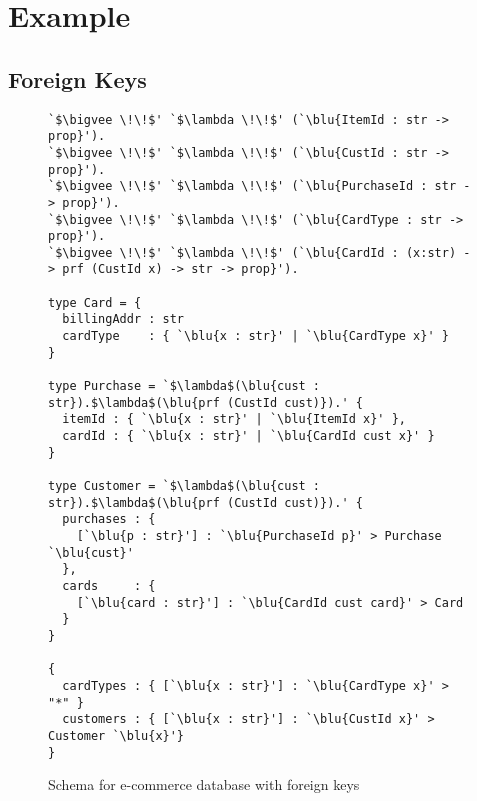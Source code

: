\documentclass[sigplan,10pt,review,anonymous]{acmart}
\newcommand{\blu}[1]{\textbf{\color{blue}{#1}}}
\begin{document}




\section{Example}




\subsection{Foreign Keys}

\begin{figure}

\begin{lstlisting}[escapeinside=`']
`$\bigvee \!\!$' `$\lambda \!\!$' (`\blu{ItemId : str -> prop}').
`$\bigvee \!\!$' `$\lambda \!\!$' (`\blu{CustId : str -> prop}').
`$\bigvee \!\!$' `$\lambda \!\!$' (`\blu{PurchaseId : str -> prop}').
`$\bigvee \!\!$' `$\lambda \!\!$' (`\blu{CardType : str -> prop}').
`$\bigvee \!\!$' `$\lambda \!\!$' (`\blu{CardId : (x:str) -> prf (CustId x) -> str -> prop}').

type Card = {
  billingAddr : str
  cardType    : { `\blu{x : str}' | `\blu{CardType x}' }
}

type Purchase = `$\lambda$(\blu{cust : str}).$\lambda$(\blu{prf (CustId cust)}).' {
  itemId : { `\blu{x : str}' | `\blu{ItemId x}' }, 
  cardId : { `\blu{x : str}' | `\blu{CardId cust x}' }
}

type Customer = `$\lambda$(\blu{cust : str}).$\lambda$(\blu{prf (CustId cust)}).' { 
  purchases : { 
    [`\blu{p : str}'] : `\blu{PurchaseId p}' > Purchase `\blu{cust}' 
  },
  cards     : { 
    [`\blu{card : str}'] : `\blu{CardId cust card}' > Card 
  }
}

{
  cardTypes : { [`\blu{x : str}'] : `\blu{CardType x}' > "*" }
  customers : { [`\blu{x : str}'] : `\blu{CustId x}' > Customer `\blu{x}'}
}
\end{lstlisting}

\caption{Schema for e-commerce database with foreign keys}
\label{fig:ecommerce}
\end{figure}
\end{document}
